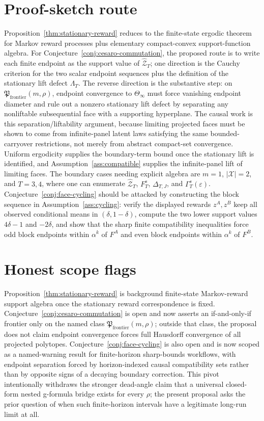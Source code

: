 \documentclass[11pt]{article}
\theoremstyle{definition}
\theoremstyle{plain}
\theoremstyle{remark}
\begin{document}
\section{Proof-sketch route}
Proposition~\ref{thm:stationary-reward} reduces to the finite-state ergodic theorem for Markov reward processes plus elementary compact-convex support-function algebra.  For Conjecture~\ref{conj:cesaro-commutation}, the proposed route is to write each finite endpoint as the support value of \(\widehat{\mathcal Z}_T\); one direction is the Cauchy criterion for the two scalar endpoint sequences plus the definition of the stationary lift defect \(\Lambda_T\).  The reverse direction is the substantive step: on \(\mathfrak P_{\mathrm{frontier}}(m,\rho)\), endpoint convergence to \(\Theta_\infty\) must force vanishing endpoint diameter and rule out a nonzero stationary lift defect by separating any nonliftable subsequential face with a supporting hyperplane.  The causal work is this separation/liftability argument, because limiting projected faces must be shown to come from infinite-panel latent laws satisfying the same bounded-carryover restrictions, not merely from abstract compact-set convergence.  Uniform ergodicity supplies the boundary-term bound once the stationary lift is identified, and Assumption~\ref{ass:compatible} supplies the infinite-panel lift of limiting faces.  The boundary cases needing explicit algebra are \(m=1\), \(|\mathcal X|=2\), and \(T=3,4\), where one can enumerate \(\widehat{\mathcal Z}_T\), \(F_T^s\), \(\Delta_{T,J}\), and \(\Gamma_T^s(\varepsilon)\).  Conjecture~\ref{conj:face-cycling} should be attacked by constructing the block sequence in Assumption~\ref{ass:cycling}: verify the displayed rewards \(z^A,z^B\) keep all observed conditional means in \((\delta,1-\delta)\), compute the two lower support values \(4\delta-1\) and \(-2\delta\), and show that the sharp finite compatibility inequalities force odd block endpoints within \(\alpha^k\) of \(F^A\) and even block endpoints within \(\alpha^k\) of \(F^B\).

\section{Honest scope flags}
Proposition~\ref{thm:stationary-reward} is background finite-state Markov-reward support algebra once the stationary reward correspondence is fixed.  Conjecture~\ref{conj:cesaro-commutation} is open and now asserts an if-and-only-if frontier only on the named class \(\mathfrak P_{\mathrm{frontier}}(m,\rho)\); outside that class, the proposal does not claim endpoint convergence forces full Hausdorff convergence of all projected polytopes.  Conjecture~\ref{conj:face-cycling} is also open and is now scoped as a named-warning result for finite-horizon sharp-bounds workflows, with endpoint separation forced by horizon-indexed causal compatibility sets rather than by opposite signs of a decaying boundary correction.  This pivot intentionally withdraws the stronger dead-angle claim that a universal closed-form nested g-formula bridge exists for every \(\rho\); the present proposal asks the prior question of when such finite-horizon intervals have a legitimate long-run limit at all.
\end{document}
